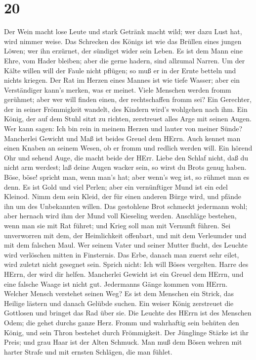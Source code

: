 \hypertarget{section-19}{%
\section{20}\label{section-19}}

 Der Wein macht lose Leute und stark Getränk macht wild; wer
dazu Lust hat, wird nimmer weise.  Das Schrecken des Königs
ist wie das Brüllen eines jungen Löwen; wer ihn erzürnet, der sündiget
wider sein Leben.  Es ist dem Mann eine Ehre, vom Hader
bleiben; aber die gerne hadern, sind allzumal Narren.  Um
der Kälte willen will der Faule nicht pflügen; so muß er in der Ernte
betteln und nichts kriegen.  Der Rat im Herzen eines Mannes
ist wie tiefe Wasser; aber ein Verständiger kann's merken, was er
meinet.  Viele Menschen werden fromm gerühmet; aber wer will
finden einen, der rechtschaffen fromm sei?  Ein Gerechter,
der in seiner Frömmigkeit wandelt, des Kindern wird's wohlgehen nach
ihm.  Ein König, der auf dem Stuhl sitzt zu richten,
zerstreuet alles Arge mit seinen Augen.  Wer kann sagen: Ich
bin rein in meinem Herzen und lauter von meiner Sünde? 
Mancherlei Gewicht und Maß ist beides Greuel dem HErrn. 
Auch kennet man einen Knaben an seinem Wesen, ob er fromm und redlich
werden will.  Ein hörend Ohr und sehend Auge, die macht
beide der HErr.  Liebe den Schlaf nicht, daß du nicht arm
werdest; laß deine Augen wacker sein, so wirst du Brots genug haben.
 Böse, böse! spricht man, wenn man's hat; aber wenn's weg
ist, so rühmet man es denn.  Es ist Gold und viel Perlen;
aber ein vernünftiger Mund ist ein edel Kleinod.  Nimm dem
sein Kleid, der für einen anderen Bürge wird, und pfände ihn um des
Unbekannten willen.  Das gestohlene Brot schmeckt jedermann
wohl; aber hernach wird ihm der Mund voll Kieseling werden.
 Anschläge bestehen, wenn man sie mit Rat führet; und Krieg
soll man mit Vernunft führen.  Sei unverworren mit dem, der
Heimlichkeit offenbart, und mit dem Verleumder und mit dem falschen
Maul.  Wer seinem Vater und seiner Mutter flucht, des
Leuchte wird verlöschen mitten in Finsternis.  Das Erbe,
danach man zuerst sehr eilet, wird zuletzt nicht gesegnet sein.
 Sprich nicht: Ich will Böses vergelten. Harre des HErrn,
der wird dir helfen.  Mancherlei Gewicht ist ein Greuel dem
HErrn, und eine falsche Waage ist nicht gut.  Jedermanns
Gänge kommen vom HErrn. Welcher Mensch verstehet seinen Weg?
 Es ist dem Menschen ein Strick, das Heilige lästern und
danach Gelübde suchen.  Ein weiser König zerstreuet die
Gottlosen und bringet das Rad über sie.  Die Leuchte des
HErrn ist des Menschen Odem; die gehet durchs ganze Herz. 
Fromm und wahrhaftig sein behüten den König, und sein Thron bestehet
durch Frömmigkeit.  Der Jünglinge Stärke ist ihr Preis; und
grau Haar ist der Alten Schmuck.  Man muß dem Bösen wehren
mit harter Strafe und mit ernsten Schlägen, die man fühlet.

